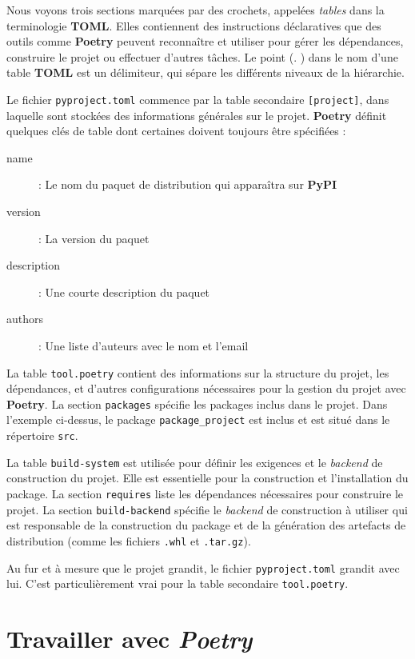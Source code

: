 Nous voyons trois sections marquées par des crochets, appelées \og \textit{tables} \fg{} dans la terminologie \textbf{TOML}. Elles contiennent des instructions déclaratives que des outils comme \textbf{Poetry} peuvent reconnaître et utiliser pour gérer les dépendances, construire le projet ou effectuer d'autres tâches. Le point (\og . \fg{}) dans le nom d'une table \textbf{TOML} est un délimiteur, qui sépare les différents niveaux de la hiérarchie.


Le fichier \texttt{pyproject.toml} commence par la table secondaire \texttt{[project]}, dans laquelle sont stockées des informations générales sur le projet. \textbf{Poetry} définit quelques clés de table dont certaines doivent toujours être spécifiées :
\begin{description}
    \item[name] : Le nom du paquet de distribution qui apparaîtra sur \textbf{PyPI}
    \item[version] : La version du paquet
    \item[description] : Une courte description du paquet
    \item[authors] : Une liste d'auteurs avec le nom et l'email
\end{description}
\bigskip

La table \texttt{tool.poetry} contient des informations sur la structure du projet, les dépendances, et d'autres configurations nécessaires pour la gestion du projet avec \textbf{Poetry}. La section \texttt{packages} spécifie les packages inclus dans le projet. Dans l'exemple ci-dessus, le package \texttt{package\_project} est inclus et est situé dans le répertoire \texttt{src}.

La table \texttt{build-system} est utilisée pour définir les exigences et le \textit{backend} de construction du projet. Elle est essentielle pour la construction et l'installation du package. La section \texttt{requires} liste les dépendances nécessaires pour construire le projet. La section \texttt{build-backend} spécifie le \textit{backend} de construction à utiliser qui est responsable de la construction du package et de la génération des artefacts de distribution (comme les fichiers \texttt{.whl} et \texttt{.tar.gz}).

Au fur et à mesure que le projet grandit, le fichier \texttt{pyproject.toml} grandit avec lui. C'est particulièrement vrai pour la table secondaire \texttt{tool.poetry}.

\section{Travailler avec \textit{Poetry}}
